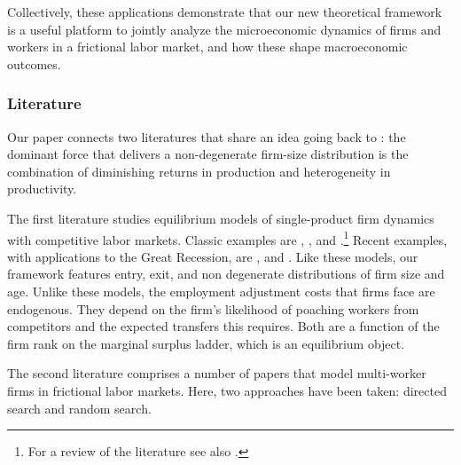 Collectively, these applications demonstrate that our new theoretical framework is a useful platform to jointly analyze the microeconomic dynamics of firms and workers in a frictional labor market, and how these shape macroeconomic outcomes.

\subsubsection*{Literature}
Our paper connects two literatures that share an idea going back to \citet{Lucas1978}: the dominant force that delivers a non-degenerate firm-size distribution is the combination of diminishing returns in production and heterogeneity in productivity.

The first literature studies equilibrium models of single-product firm dynamics with competitive labor markets.
Classic examples are \citet{HopenhaynEMET}, \citet{HopenhaynRogersonJPE}, and \citet{luttmer2011}.\footnote{%
    For a review of the literature see also \citet{luttmer2010}.}
Recent examples, with applications to the Great Recession, are \citet{arellanobaikehoe2019}, \citet{ClementiPalazzoWP} and \citet{sedlacek2020}.
Like these models, our framework features entry, exit, and non degenerate distributions of firm size and age.
Unlike these models, the employment adjustment costs that firms face are endogenous.
They depend on the firm's likelihood of poaching workers from competitors and the expected transfers this requires.
Both are a function of the firm rank on the marginal surplus ladder, which is an equilibrium object.

The second literature comprises a number of papers that model multi-worker firms in frictional labor markets.
Here, two approaches have been taken: directed search and random search.

